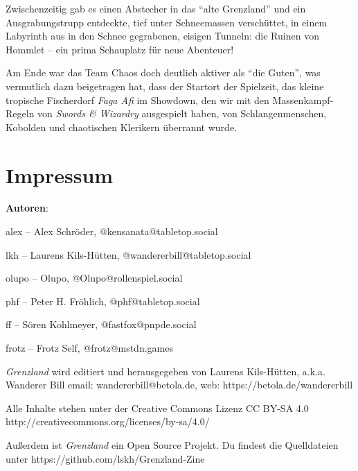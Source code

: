 \documentclass[11pt]{wbzine}
\begin{document}
\begin{multicols}{2}
Zwischenzeitig gab es einen Abstecher in das ``alte Grenzland'' und
ein Ausgrabungstrupp entdeckte, tief unter Schneemassen verschüttet,
in einem Labyrinth aus in den Schnee gegrabenen, eisigen Tunneln:
die Ruinen von Hommlet -- ein prima Schauplatz für neue Abenteuer!

Am Ende war das Team Chaos doch deutlich aktiver als ``die
Guten'', was vermutlich dazu beigetragen hat, dass der Startort
der Spielzeit, das kleine tropische Fischerdorf \textit{Faga Afi} im
Showdown, den wir mit den Massenkampf-Regeln von \textit{Swords \&
Wizardry} ausgespielt haben, von Schlangenmenschen, Kobolden und 
chaotischen Klerikern überrannt wurde.



\end{multicols}

\section{Impressum}

\textbf{Autoren}:

alex -- Alex Schröder, @kensanata@tabletop.social

lkh -- Laurens Kils-Hütten, @wandererbill@tabletop.social

olupo -- Olupo, @Olupo@rollenspiel.social

phf -- Peter H. Fröhlich, @phf@tabletop.social

ff -- Sören Kohlmeyer, @fastfox@pnpde.social

frotz -- Frotz Self, @frotz@mstdn.games

\textit{Grenzland} wird editiert und
herausgegeben von Laurens Kils-Hütten,
a.k.a. Wanderer Bill
email: wandererbill@betola.de, web: https://betola.de/wandererbill

Alle Inhalte stehen unter der Creative Commons Lizenz
CC BY-SA 4.0\\
http://creativecommons.org/licenses/by-sa/4.0/

Außerdem ist \textit{Grenzland} ein Open Source Projekt. Du
findest die Quelldateien unter
https://github.com/lskh/Grenzland-Zine

\newpage\thispagestyle{empty}\null

\end{document}
